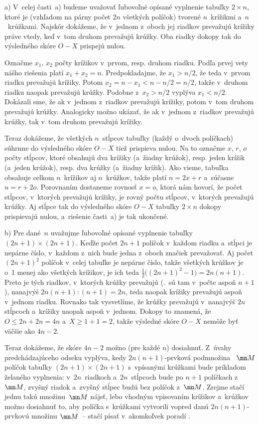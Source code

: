 ﻿{%
a) V~celej časti~a) budeme uvažovať ľubovoľné opísané vyplnenie tabuľky
${2\times n}$, ktoré je (vzhľadom na párny počet $2n$ všetkých políčok)
tvorené $n$~krížikmi a~$n$~krúžkami. Najskôr dokážeme, že v~jednom
z~oboch jej riadkov prevažujú krížiky práve vtedy, keď v~tom druhom
prevažujú krúžky. Oba riadky dokopy tak do výsledného skóre
$O-X$ prispejú nulou.

Označme $x_1$, $x_2$ počty krížikov v~prvom, resp. druhom riadku.
Podľa prvej vety nášho riešenia platí $x_1+x_2=n$. Predpokladajme, že
$x_1>n/2$, že teda v~prvom riadku prevažujú krížiky. Potom
$x_2=n-x_1<n-n/2=n/2$, takže v~druhom riadku naopak prevažujú
krúžky. Podobne z~$x_2>n/2$ vyplýva $x_1<n/2$. Dokázali sme, že
ak v~jednom z~riadkov prevažujú krížiky, potom v~tom druhom prevažujú
krúžky. Analogicky možno ukázať, že ak v~jednom z~riadkov prevažujú
krúžky, tak v~tom druhom prevažujú krížiky.

Teraz dokážeme, že všetkých $n$~stĺpcov tabuľky (každý o~dvoch políčkach)
súhrnne do výsledného skóre $O-X$ tiež prispieva nulou. Na to
označme $x$, $r$, $o$ počty stĺpcov, ktoré obsahujú dva krížiky
(a~žiadny krúžok), resp. jeden krížik (a~jeden krúžok), resp. dva
krúžky (a~žiadny krížik). Ako vieme, tabuľka obsahuje celkom $n$~krížikov aj $n$~krúžkov, takže platí $n=2 x +r$ a~súčasne
$n=r+2 o$. Porovnaním dostaneme rovnosť $x=o$, ktorá nám hovorí,
že počet stĺpcov, v~ktorých prevažujú krížiky, je rovný počtu stĺpcov,
v~ktorých prevažujú krúžky. Aj stĺpce tak do výsledného skóre $O-X$
tabuľky $2\times n$ dokopy prispievajú nulou, a~riešenie časti~a)
je tak ukončené.

\smallskip
b) Pre dané~$n$ uvažujme ľubovoľné opísané vyplnenie tabuľky $(2n+1)\times (2n+1)$.
Keďže počet $2n+1$ políčok v~každom riadku a~stĺpci je nepárne číslo,
v~každom z~nich bude jedna z~oboch značiek prevažovať.
Aj počet $(2n+1)^2$ políčok v~celej tabuľke je nepárne číslo,
takže všetkých krúžkov je o~1 menej ako všetkých krížikov, je ich teda
$\frac12\bigl((2n+1)^2-1\bigr)=2n(n+1)$. Preto je tých riadkov, v~ktorých krúžky prevažujú (\tj.~sú tam v~počte aspoň $n+1$),
nanajvýš $2n(n+1):(n+1)=2n$, teda naopak krížiky prevažujú aspoň
v~jednom riadku. Rovnako tak vysvetlíme, že krúžky prevažujú v~nanajvýš
$2n$ stĺpcoch a~krížiky naopak aspoň v~jednom. Dokopy to
znamená, že $O\le 2n+2n=4n$ a~$X\ge 1+1=2$, takže výsledné skóre
$O-X$ nemôže byť väčšie ako $4n-2$.

Teraz dokážeme, že skóre $4n-2$ možno (pre každé $n$) dosiahnuť.
Z~úvahy predchádzajúceho odseku vyplýva, kedy $2n(n+1)$-prvková podmnožina~
$\mn M$ políčok tabuľky ${(2n+1)}\times ({2n+1})$ s~vpísanými krúžkami bude
príkladom želaného vyplnenia: v~$2n$~riadkoch a~$2n$~stĺpcoch bude po
$n+1$ políčkach z~$\mn M$, zvyšný riadok a~zvyšný stĺpec budú bez
políčok z~$\mn M$. Zrejme stačí jednu takú množinu~$\mn M$ nájsť, lebo
vhodným vpisovaním krížikov a~krúžkov možno dosiahnuť to, aby políčka
s~krúžkami vytvorili vopred danú $2n(n+1)$-prvkovú množinu $\mn M$~--
stačí písať v~akomkoľvek poradí .

}
